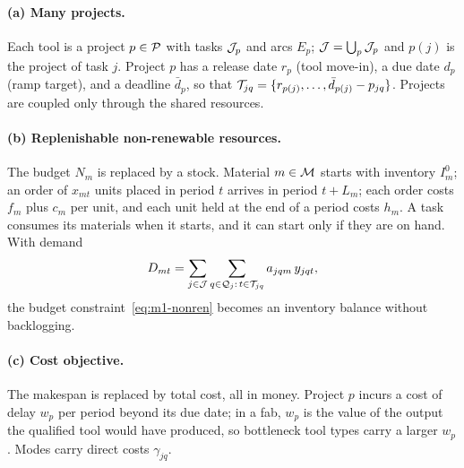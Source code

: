 \paragraph{(a) Many projects.}
Each tool is a project $p \in \mathcal{P}$ with tasks $\mathcal{J}_p$ and arcs $E_p$;
$\mathcal{J} = \bigcup_p \mathcal{J}_p$ and $p(j)$ is the project of task $j$. Project $p$
has a release date $r_p$ (tool move-in), a due date $d_p$ (ramp target), and a
deadline $\bar d_p$, so that
$\mathcal{T}_{jq} = \{ r_{p(j)}, \dots, \bar d_{p(j)} - p_{jq} \}$.
Projects are coupled only through the shared resources.

\paragraph{(b) Replenishable non-renewable resources.}
The budget $N_m$ is replaced by a stock. Material $m \in \mathcal{M}$ starts with
inventory $I^0_m$; an order of $x_{mt}$ units placed in period $t$ arrives in
period $t + L_m$; each order costs $f_m$ plus $c_m$ per unit, and each unit
held at the end of a period costs $h_m$. A task consumes its materials when it
starts, and it can start only if they are on hand. With demand
\begin{equation}\label{eq:m3-demand}
    D_{mt} = \sum_{j \in \mathcal{J}} \sum_{q \in \mathcal{Q}_j :\, t \in \mathcal{T}_{jq}} a_{jqm}\, y_{jqt},
\end{equation}
the budget constraint~\eqref{eq:m1-nonren} becomes an inventory balance
without backlogging.

\paragraph{(c) Cost objective.}
The makespan is replaced by total cost, all in money. Project $p$ incurs a
cost of delay $w_p$ per period beyond its due date; in a fab, $w_p$ is the
value of the output the qualified tool would have produced, so bottleneck
tool types carry a larger $w_p$. Modes carry direct costs $\gamma_{jq}$.

